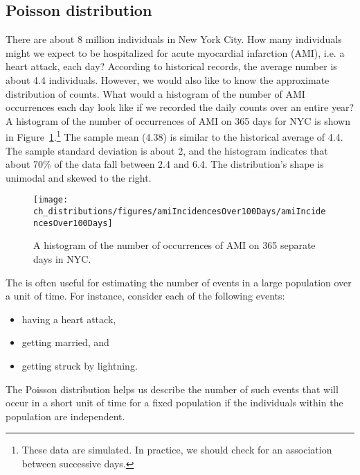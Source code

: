 \textC{\pagebreak}


\subsection{Poisson distribution}
\label{poisson}


\begin{example}{There are about 8 million individuals in New York City. How many individuals might we expect to be hospitalized for acute myocardial infarction (AMI), i.e. a heart attack, each day? According to historical records, the average number is about 4.4 individuals. However, we would also like to know the approximate distribution of counts. What would a histogram of the number of AMI occurrences each day look like if we recorded the daily counts over an entire year?} \label{amiIncidencesEachDayOver1YearInNYCExample}
A histogram of the number of occurrences of AMI on 365 days for NYC is shown in Figure~\ref{amiIncidencesOver100Days}.\footnote{These data are simulated. In practice, we should check for an association between successive days.} The sample mean (4.38) is similar to the historical average of 4.4. The sample standard deviation is about 2, and the histogram indicates that about 70\% of the data fall between 2.4 and 6.4. The distribution's shape is unimodal and skewed to the right.
\end{example}

\begin{figure}[h]
\centering
\texttt{[image: ch\_distributions/figures/amiIncidencesOver100Days/amiIncidencesOver100Days]}
\caption{A histogram of the number of occurrences of AMI on 365 separate days in NYC.}
\label{amiIncidencesOver100Days}
\end{figure}

The  is often useful for estimating the number of events in a large population over a unit of time. For instance, consider each of the following events:
\begin{itemize}
\setlength{\itemsep}{0mm}
\item having a heart attack,
\item getting married, and
\item getting struck by lightning.
\end{itemize}
The Poisson distribution helps us describe the number of such events that will occur in a short unit of time for a fixed population if the individuals within the population are independent.

